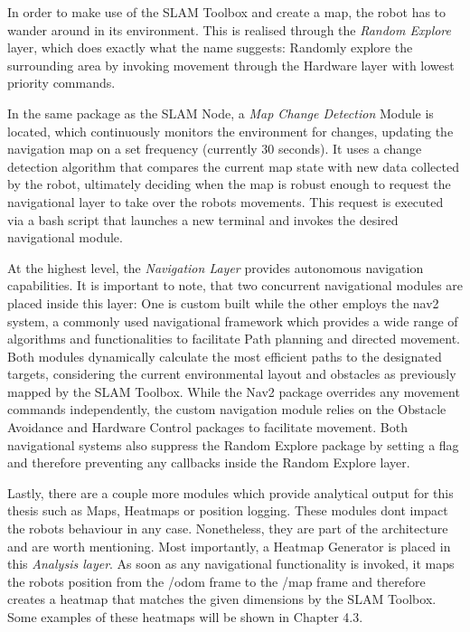 \documentclass[%
paper=A4,               %
twoside=true,           %
openright,              %
11pt,                   %
bibliography=totoc,     %
titlepage=on,           %
DIV=12,                 %
BCOR=1.5cm,             %
parskip=half,            %
final
]{scrreprt}
\begin{document}
	In order to make use of the SLAM Toolbox and create a map, the robot has to wander around in its environment. This is realised through the \textit{Random Explore} layer, which does exactly what the name suggests: Randomly explore the surrounding area by invoking movement through the Hardware layer with lowest priority commands. 
	
	In the same package as the SLAM Node, a \textit{Map Change Detection} Module is located, which continuously monitors the environment for changes, updating the navigation map on a set frequency (currently 30 seconds). It uses a change detection algorithm that compares the current map state with new data collected by the robot, ultimately deciding when the map is robust enough to request the navigational layer to take over the robots movements. This request is executed via a bash script that launches a new terminal and invokes the desired navigational module.
	
	At the highest level, the \textit{Navigation Layer} provides autonomous navigation capabilities. It is important to note, that two concurrent navigational modules are placed inside this layer: One is custom built while the other employs the nav2 system, a commonly used navigational framework which provides a wide range of algorithms and functionalities to facilitate Path planning and directed movement. \autocite{macenskiMarathonNavigationSystem2020} Both modules dynamically calculate the most efficient paths to the designated targets, considering the current environmental layout and obstacles as previously mapped by the SLAM Toolbox. While the Nav2 package overrides any movement commands independently, the custom navigation module relies on the Obstacle Avoidance and Hardware Control packages to facilitate movement. Both navigational systems also suppress the Random Explore package by setting a flag and therefore preventing any callbacks inside the Random Explore layer. 
	
	Lastly, there are a couple more modules which provide analytical output for this thesis such as Maps, Heatmaps or position logging. These modules dont impact the robots behaviour in any case. Nonetheless, they are part of the architecture and are worth mentioning. Most importantly, a Heatmap Generator is placed in this \textit{Analysis layer}. As soon as any navigational functionality is invoked, it maps the robots position from the /odom frame to the /map frame and therefore creates a heatmap that matches the given dimensions by the SLAM Toolbox. Some examples of these heatmaps will be shown in Chapter 4.3.
	
\end{document}
